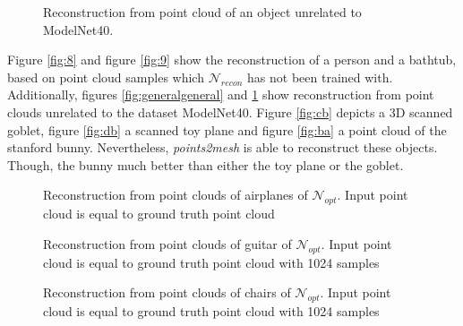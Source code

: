 \begin{figure}[htbp]
  \centering
  \caption{Reconstruction from point cloud of an object unrelated to ModelNet40.} \label{fig:bunny}
\end{figure}
  Figure \ref{fig:8} and figure \ref{fig:9} show the reconstruction of a person and a bathtub, based on point cloud samples 
  which $\mathcal{N}_{recon}$ has not been trained with. Additionally, figures \ref{fig:generalgeneral} and \ref{fig:bunny} show
  reconstruction from point clouds unrelated to the dataset ModelNet40. Figure \ref{fig:cb} depicts a 3D scanned goblet, figure \ref{fig:db} a scanned
  toy plane and figure \ref{fig:ba} a point cloud of the stanford bunny. Nevertheless, \emph{points2mesh} is able to reconstruct these objects. Though, the bunny much
  better than either the toy plane or the goblet.
\begin{figure}[htbp]
 \centering
  \caption{Reconstruction from point clouds of airplanes of $\mathcal{N}_{opt}$. Input point cloud is equal to ground truth point cloud} \label{fig:10}
\end{figure}
\begin{figure}[htbp]
  \centering
  \caption{Reconstruction from point clouds of guitar of $\mathcal{N}_{opt}$. Input point cloud is equal to ground truth point cloud with 1024 samples} \label{fig:11}
\end{figure}
\begin{figure}[htbp]
  \centering
  \caption{Reconstruction from point clouds of chairs of $\mathcal{N}_{opt}$. Input point cloud is equal to ground truth point cloud with 1024 samples} \label{fig:10}
\end{figure}

